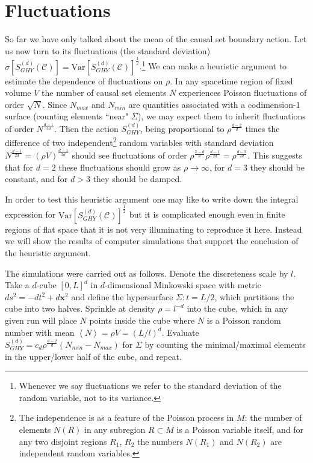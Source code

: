 \documentclass[12pt]{article}
\begin{document}
\section{Fluctuations}
So far we have only talked about the mean of the causal set boundary action. Let us now turn to its fluctuations (the standard deviation) $\sigma[S^{(d)}_{GHY}(\mathcal C)]=\text{Var}[S^{(d)}_{GHY}(\mathcal C)]^\frac12$.\footnote{Whenever we say fluctuations we refer to the standard deviation of the random variable, not to its variance.} We can make a heuristic argument to estimate the dependence of fluctuations on $\rho$. In any spacetime region of fixed volume $V$ the number of causal set elements $N$ experiences Poisson fluctuations of order $\sqrt N$. Since $N_{max}$ and $N_{min}$ are quantities associated with a codimension-1 surface (counting elements ``near" $\Sigma$), we may expect them to inherit fluctuations of order $N^\frac{d-1}{2d}$. Then the action $S^{(d)}_{GHY}$, being proportional to $\rho^\frac{d-2}{d}$ times the difference of two independent\footnote{The independence is as a feature of the Poisson process in $M$: the number of elements $N(R)$ in any subregion $R\subset M$ is a Poisson variable itself, and for any two disjoint regions $R_1$, $R_2$ the numbers $N(R_1)$ and $N(R_2)$ are independent random variables.} random variables with standard deviation $N^\frac{d-1}{2d} = (\rho V)^\frac{d-1}{2d}$ should see fluctuations of order $\rho^\frac{2-d}{d}\rho^\frac{d-1}{2d}=\rho^\frac{d-3}{2d}$. This suggests that for $d=2$ these fluctuations should grow as $\rho\rightarrow\infty$, for $d=3$ they should be constant, and for $d>3$ they should be damped.

In order to test this heuristic argument one may like to write down the integral expression for $\text{Var}[S^{(d)}_{GHY}(\mathcal C)]^\frac12$ but it is complicated enough even in finite regions of flat space that it is not very illuminating to reproduce it here. Instead we will show the results of computer simulations that support the conclusion of the heuristic argument. 
 
The simulations were carried out as follows. Denote the discreteness scale by $l$. Take a $d$-cube $[0,L]^d$ in $d$-dimensional Minkowski space with metric $ds^2=-dt^2+d{\mathbf x}^2$ and define the hypersurface $\Sigma: t=L/2$, which partitions the cube into two halves. Sprinkle at density $\rho=l^{-d}$ into the cube, which in any given run will place $N$ points inside the cube where $N$ is a Poisson random number with mean $\left\langle N\right\rangle = \rho V=  (L/l)^d$. Evaluate $S^{(d)}_{GHY}=c_d\rho^\frac{d-2}{d}(N_{min} - N_{max})$ for $\Sigma$ by counting the minimal/maximal elements in the upper/lower half of the cube, and repeat.
\end{document}
